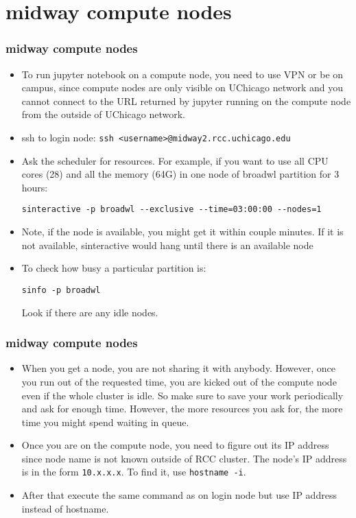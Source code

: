\documentclass{beamer}
\begin{document}
\section{midway compute nodes}
\begin{frame}[fragile]
  \frametitle{midway compute nodes}
  
  \begin{itemize}
  \item To run jupyter notebook on a compute node, you need to use VPN or be on campus, since compute nodes are only visible on UChicago network
    and you cannot connect to the URL returned by jupyter running on the compute node from the outside of UChicago network.
  \item ssh to login node: {\color{mycolorcli}\verb|ssh <username>@midway2.rcc.uchicago.edu|}
  \item Ask the scheduler for resources. For example, if you want to use all CPU cores (28) and all the memory (64G) in one node of
    broadwl partition for 3 hours:
    {\color{mycolorcli}
      {\tiny
\begin{verbatim}
sinteractive -p broadwl --exclusive --time=03:00:00 --nodes=1
\end{verbatim}
      }
    }
  \item Note, if the node is available, you might get it within couple minutes. If it is not available, sinteractive would hang until there is
    an available node
  \item To check how busy a particular partition is:
    {\color{mycolorcli}
      {\tiny
\begin{verbatim}
sinfo -p broadwl
\end{verbatim}
      }
    }
    Look if there are any {\color{mycolorcli}idle} nodes.
  \end{itemize}
\end{frame}


\begin{frame}[fragile]
  \frametitle{midway compute nodes}
  
  \begin{itemize}
  \item When you get a node, you are not sharing it with anybody. However, once you run out of the requested time, you are kicked out of
    the compute node even if the whole cluster is idle. So make sure to save your work periodically and ask for enough time. However, the more resources you ask for, the more time
    you might spend waiting in queue.
  \item Once you are on the compute node, you need to figure out its IP address since node name is not known outside of RCC cluster.
    The node's IP address is in the form {\color{mycolorcli}\verb|10.x.x.x|}. To find it, use {\color{mycolorcli}\verb|hostname -i|}.
  \item After that execute the same command as on login node but use IP address instead of hostname.
  \end{itemize}
\end{frame}
\end{document}
